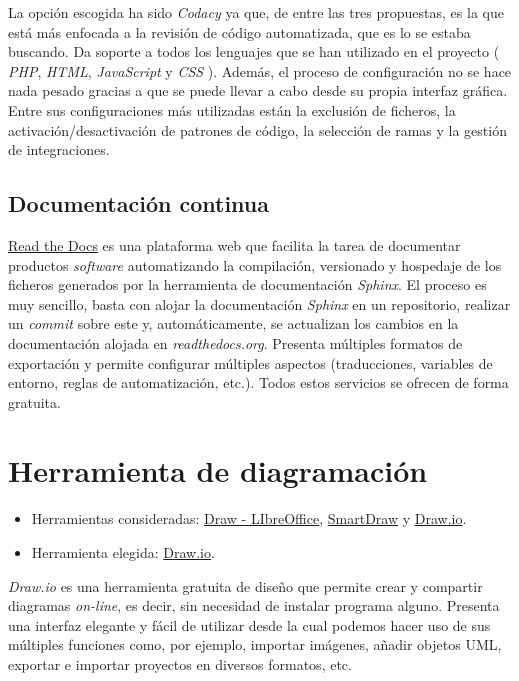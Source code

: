 \documentclass[
]{article}
\providecommand{\tightlist}{%
  \setlength{\itemsep}{0pt}\setlength{\parskip}{0pt}}
\begin{document}
La opción escogida ha sido \emph{Codacy} ya que, de entre las tres
propuestas, es la que está más enfocada a la revisión de código
automatizada, que es lo se estaba buscando. Da soporte a todos los
lenguajes que se han utilizado en el proyecto ( \emph{PHP}, \emph{HTML},
\emph{JavaScript} y \emph{CSS} ). Además, el proceso de configuración no
se hace nada pesado gracias a que se puede llevar a cabo desde su propia
interfaz gráfica. Entre sus configuraciones más utilizadas están la
exclusión de ficheros, la activación/desactivación de patrones de
código, la selección de ramas y la gestión de integraciones.

\hypertarget{documentaciuxf3n-continua}{%
\subsection{Documentación continua}\label{documentaciuxf3n-continua}}

\href{https://readthedocs.org/}{Read the Docs} es una plataforma web que
facilita la tarea de documentar productos \emph{software} automatizando
la compilación, versionado y hospedaje de los ficheros generados por la
herramienta de documentación \emph{Sphinx}. El proceso es muy sencillo,
basta con alojar la documentación \emph{Sphinx} en un repositorio,
realizar un \emph{commit} sobre este y, automáticamente, se actualizan
los cambios en la documentación alojada en \emph{readthedocs.org}.
Presenta múltiples formatos de exportación y permite configurar
múltiples aspectos (traducciones, variables de entorno, reglas de
automatización, etc.). Todos estos servicios se ofrecen de forma
gratuita.

\hypertarget{herramienta-de-diagramaciuxf3n}{%
\section{Herramienta de
diagramación}\label{herramienta-de-diagramaciuxf3n}}

\begin{itemize}
\tightlist
\item
  Herramientas consideradas:
  \href{https://es.libreoffice.org/descubre/draw/}{Draw - LIbreOffice},
  \href{https://www.smartdraw.com/}{SmartDraw} y
  \href{https://app.diagrams.net/}{Draw.io}.
\item
  Herramienta elegida: \href{https://app.diagrams.net/}{Draw.io}.
\end{itemize}

\emph{Draw.io} es una herramienta gratuita de diseño que permite crear y
compartir diagramas \emph{on-line}, es decir, sin necesidad de instalar
programa alguno. Presenta una interfaz elegante y fácil de utilizar
desde la cual podemos hacer uso de sus múltiples funciones como, por
ejemplo, importar imágenes, añadir objetos UML, exportar e importar
proyectos en diversos formatos, etc.
\end{document}
